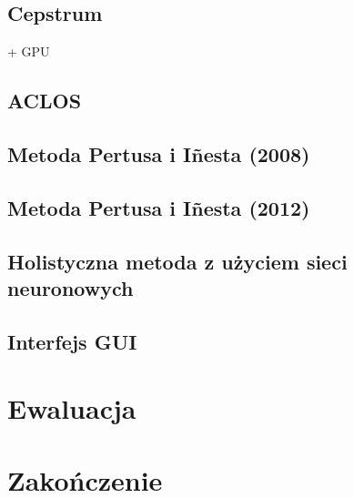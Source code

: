 \documentclass[12pt,a4paper,twoside]{mwart}
\begin{document}
\subsection{Cepstrum}\label{sec:impl:alg:ceps}
+ GPU
\subsection{ACLOS}\label{sec:impl:alg:aclos}
\subsection{Metoda Pertusa i Iñesta (2008)}\label{sec:impl:alg:specSmoothnes}
\subsection{Metoda Pertusa i Iñesta (2012)}\label{sec:impl:alg:specSmoothnes:improved}
\subsection{Holistyczna metoda z użyciem sieci neuronowych}
\subsection{Interfejs GUI}
\cite{reactWDzialaniu}\cite{tsDocumentation}

\section{Ewaluacja} \label{sec:ewal}
\newpage
\section{Zakończenie} \label{sec:end}
\newpage
\end{document}
